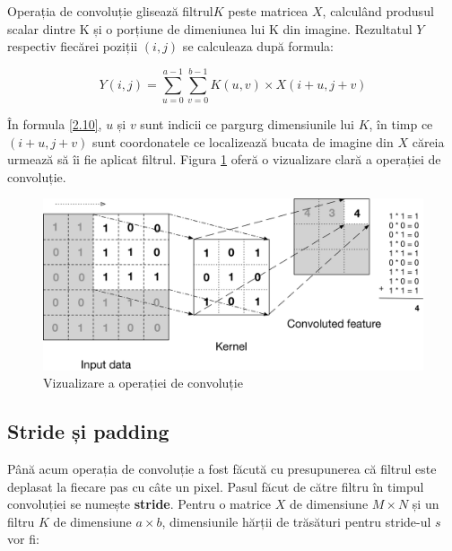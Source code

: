 Operația de convoluție glisează filtrul\(K\) peste matricea \(X\), calculând produsul scalar dintre K și o porțiune de dimeniunea lui K din imagine. Rezultatul \(Y\) respectiv fiecărei poziții \((i, j)\) se calculeaza după formula:

\begin{equation}
    Y(i, j) = \sum_{u=0}^{a-1} \sum_{v=0}^{b-1} K(u, v) \times X(i+u, j+v)
    \label{2.10}
\end{equation}

În formula \ref{2.10}, \(u\) și \(v\) sunt indicii ce pargurg dimensiunile lui \(K\), în timp ce \((i+u, j+v)\) sunt coordonatele ce localizează bucata de imagine din \(X\) căreia urmează să îi fie aplicat filtrul. Figura \ref{Figura 2.10} oferă o vizualizare clară a operației de convoluție.

\begin{figure}[h]
         \centering 
         \includegraphics[width=.85\linewidth]{images/Convolutie.png}
         \captionsetup{font=footnotesize}
         \caption{Vizualizare a operației de convoluție\cite{convolution}}
         \label{Figura 2.10}
\end{figure}
\newpage
\subsection{Stride și padding}

Până acum operația de convoluție a fost făcută cu presupunerea că filtrul este deplasat la fiecare pas cu câte un pixel. Pasul făcut de către filtru în timpul convoluției se numește \textbf{stride}.
Pentru o matrice \(X\) de dimensiune \(M \times N\) și un filtru \(K\) de dimensiune \(a \times b\), dimensiunile hărții de trăsături pentru stride-ul $s$ vor fi:


